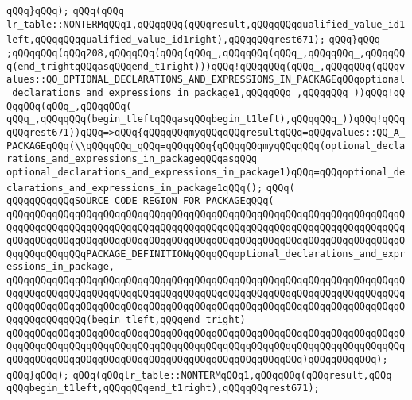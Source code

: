 \verb|qQQq}qQQq);|\newline
\verb|qQQq(qQQq|\newline
\verb|lr_table::NONTERMqQQq1,qQQqqQQq(qQQqresult,qQQqqQQqqualified_value_id1left,qQQqqQQqqualified_value_id1right),qQQqqQQqrest671);|\newline
\verb|qQQq}qQQq|\newline
\verb|;qQQqqQQq(qQQq208,qQQqqQQq(qQQq(qQQq_,qQQqqQQq(qQQq_,qQQqqQQq_,qQQqqQQq(end_trightqQQqasqQQqend_t1right)))qQQq!qQQqqQQq(qQQq_,qQQqqQQq(qQQqvalues::QQ_OPTIONAL_DECLARATIONS_AND_EXPRESSIONS_IN_PACKAGEqQQqoptional_declarations_and_expressions_in_package1,qQQqqQQq_,qQQqqQQq_))qQQq!qQQqqQQq(qQQq_,qQQqqQQq(|\newline
\verb|qQQq_,qQQqqQQq(begin_tleftqQQqasqQQqbegin_t1left),qQQqqQQq_))qQQq!qQQqqQQqrest671))qQQq=>qQQq{qQQqqQQqmyqQQqqQQqresultqQQq=qQQqvalues::QQ_A_PACKAGEqQQq(\\qQQqqQQq_qQQq=qQQqqQQq{qQQqqQQqmyqQQqqQQq(optional_declarations_and_expressions_in_packageqQQqasqQQq|\newline
\verb|optional_declarations_and_expressions_in_package1)qQQq=qQQqoptional_declarations_and_expressions_in_package1qQQq();|\newline
\verb|qQQq(|\newline
\verb|qQQqqQQqqQQqSOURCE_CODE_REGION_FOR_PACKAGEqQQq(|\newline
\verb|qQQqqQQqqQQqqQQqqQQqqQQqqQQqqQQqqQQqqQQqqQQqqQQqqQQqqQQqqQQqqQQqqQQqqQQqqQQqqQQqqQQqqQQqqQQqqQQqqQQqqQQqqQQqqQQqqQQqqQQqqQQqqQQqqQQqqQQqqQQqqQQqqQQqqQQqqQQqqQQqqQQqqQQqqQQqqQQqqQQqqQQqqQQqqQQqqQQqqQQqqQQqqQQqqQQqqQQqqQQqqQQqPACKAGE_DEFINITIONqQQqqQQqoptional_declarations_and_expressions_in_package,|\newline
\verb|qQQqqQQqqQQqqQQqqQQqqQQqqQQqqQQqqQQqqQQqqQQqqQQqqQQqqQQqqQQqqQQqqQQqqQQqqQQqqQQqqQQqqQQqqQQqqQQqqQQqqQQqqQQqqQQqqQQqqQQqqQQqqQQqqQQqqQQqqQQqqQQqqQQqqQQqqQQqqQQqqQQqqQQqqQQqqQQqqQQqqQQqqQQqqQQqqQQqqQQqqQQqqQQqqQQqqQQqqQQqqQQq(begin_tleft,qQQqend_tright)|\newline
\verb|qQQqqQQqqQQqqQQqqQQqqQQqqQQqqQQqqQQqqQQqqQQqqQQqqQQqqQQqqQQqqQQqqQQqqQQqqQQqqQQqqQQqqQQqqQQqqQQqqQQqqQQqqQQqqQQqqQQqqQQqqQQqqQQqqQQqqQQqqQQqqQQqqQQqqQQqqQQqqQQqqQQqqQQqqQQqqQQqqQQqqQQqqQQqqQQq)qQQqqQQqqQQq);|\newline
\verb|qQQq}qQQq);|\newline
\verb|qQQq(qQQqlr_table::NONTERMqQQq1,qQQqqQQq(qQQqresult,qQQq|\newline
\verb|qQQqbegin_t1left,qQQqqQQqend_t1right),qQQqqQQqrest671);|\newline
